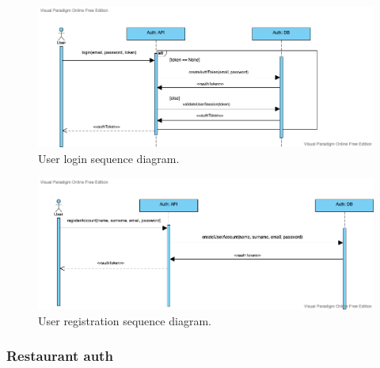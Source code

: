 \begin{figure}
    \includegraphics[width=17cm]{../docs/sequence/userAuth/auth.png}
    \caption{User login sequence diagram.}
    \label{fig:user_login}
\end{figure}

\begin{figure}
    \includegraphics[width=\linewidth]{../docs/sequence/userRegistration/registerUser.png}
    \caption{User registration sequence diagram.}
    \label{fig:user_registration}
\end{figure}

\subsubsection{Restaurant auth}

